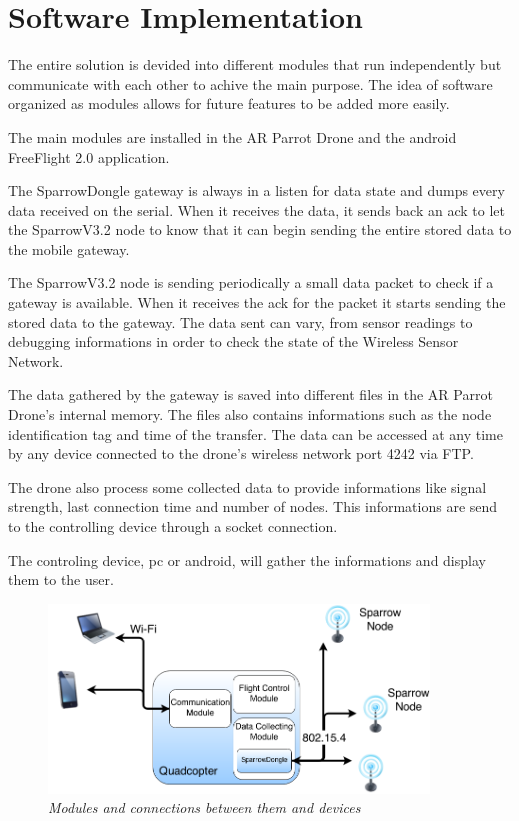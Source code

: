 \normalfont\normalsize
\chapter{Software Implementation}

The entire solution is devided into different modules that run independently  but communicate with each other to achive the main purpose. The idea of software organized as modules allows for future features to be added more easily.

The main modules are installed in the AR Parrot Drone and the android FreeFlight 2.0 application.

The SparrowDongle gateway is always in a listen for data state and dumps every data received on the serial. When it receives the data, it sends back an ack to let the SparrowV3.2 node to know that it can begin sending the entire stored data to the mobile gateway. 

The SparrowV3.2 node is sending periodically a small data packet to check if a gateway is available. When it receives the ack for the packet it starts sending the stored data to the gateway. The data sent can vary, from sensor readings to debugging informations in order to check the state of the Wireless Sensor Network.

The data gathered by the gateway is saved into different files in the AR Parrot Drone's internal memory. The files also contains informations such as the node identification tag and time of the transfer. The data can be accessed at any time by any device connected to the drone's wireless network port 4242 via FTP.

The drone also process some collected data to provide informations like signal strength, last connection time and number of nodes. This informations are send to the controlling device through a socket connection.

The controling device, pc or android, will gather the informations and display them to the user.

\clearpage

\begin{figure}[ht]
\begin{center}
\includegraphics[width=0.9\textwidth]{implementation/organigrama.png}
\end{center}
\caption{\small \itshape{Modules and connections between them and devices}}
\end{figure}



